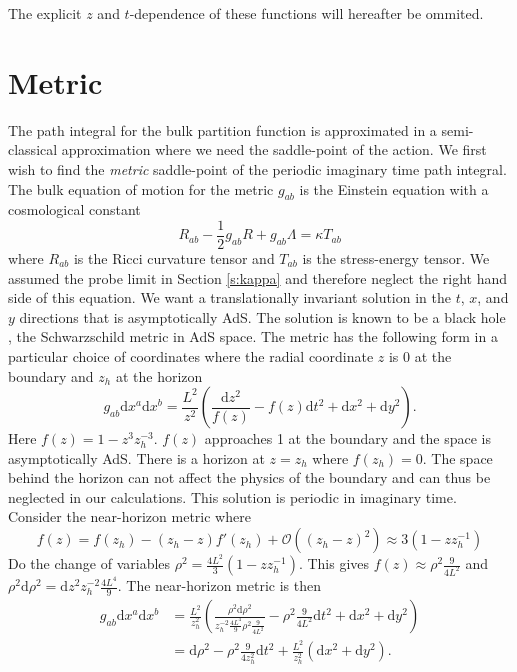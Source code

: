 \documentclass[12pt]{report}
\renewcommand{\d}{\ensuremath{\mathrm{d}}}
\begin{document}
The explicit $z$ and $t$-dependence of these functions will hereafter be ommited. 
\section{Metric\label{s:metric}}
The path integral for the bulk partition function is approximated in a semi-classical approximation where we need the saddle-point of the action. We first wish to find the \emph{metric} saddle-point of the periodic imaginary time path integral. The bulk equation of motion for the metric $g_{ab}$ is the Einstein equation with a cosmological constant
\begin{equation}
R_{ab}-\frac{1}{2}g_{ab}R+g_{ab}\Lambda=\kappa T_{ab}\label{einstein}
\end{equation}
where $R_{ab}$ is the Ricci curvature tensor and $T_{ab}$ is the stress-energy tensor. We assumed the probe limit in Section \ref{s:kappa} and therefore neglect the right hand side of this equation. We want a translationally invariant solution in the $t$, $x$, and $y$ directions that is asymptotically AdS. The solution is known to be a black hole \cite{McGreevy:2009xe}, the Schwarzschild metric in AdS space. The metric has the following form in a particular choice of coordinates where the radial coordinate $z$ is 0 at the boundary and $z_h$ at the horizon
\begin{equation}
 g_{ab}\d x^a\d x^b=\frac{L^2}{z^2}\left(\frac{\d z^2}{f(z)}-f(z)\d t^2+\d x^2+\d y^2\right).\label{metric}
\end{equation}
Here $f(z)=1-z^3z_h^{-3}$. $f(z)$ approaches 1 at the boundary and the space is asymptotically AdS. There is a horizon at $z=z_h$ where $f(z_h)=0$. The space behind the horizon can not affect the physics of the boundary and can thus be neglected in our calculations. This solution is periodic in imaginary time. Consider the near-horizon metric where
\begin{equation}
  f(z)=f(z_h)-(z_h-z)f'(z_h)+\mathcal{O}((z_h-z)^2)\approx 3(1-zz_h^{-1})
\end{equation}
Do the change of variables $\rho^2=\frac{4L^2}{3}(1-zz_h^{-1})$. This gives $f(z)\approx \rho^2\frac{9}{4L^2}$ and $\rho^2\d \rho^2=\d z^2 z_h^{-2}\frac{4L^4}{9}$. The near-horizon metric is then
\begin{equation}
\begin{split}
 g_{ab}\d x^a\d x^b&=\frac{L^2}{z_h^2}\left(\frac{\rho^2\d \rho^2  }{z_h^{-2}\frac{4L^4}{9}\rho^2\frac{9}{4L^2}}-\rho^2\frac{9}{4L^2}\d t^2+\d x^2+\d y^2\right)\\
&= \d \rho^2 -\rho^2\frac{9}{4z_h^2}\d t^2+\frac{L^2}{z_h^2}\left(\d x^2+\d y^2\right).
\end{split}
\end{equation}
\end{document}
